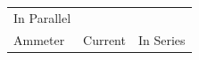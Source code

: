 {\begin{tabular}[t]{|l|l|l|}
    
        In Parallel%
     \tabularnewline\cline{1-1}\cline{2-2}\cline{3-3}
    
    
        Ammeter &
    
    
        Current &
    
    
        In Series%
     \tabularnewline\cline{1-1}\cline{2-2}\cline{3-3}
    \end{tabular}} %
      \addtocounter{footnote}{-0}
      
    
